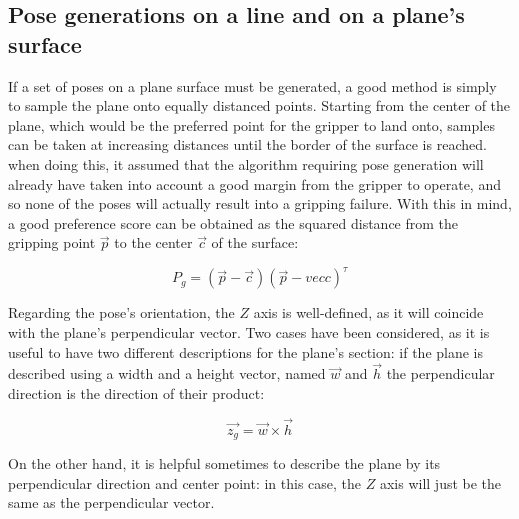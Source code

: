 \subsection{Pose generations on a line and on a plane's surface}
If a set of poses on a plane surface must be generated, a good method is simply
to sample the plane onto equally distanced points. Starting from the center of
the plane, which would be the preferred point for the gripper to land onto,
samples can be taken at increasing distances until the border of the surface is
reached. when doing this, it assumed that the algorithm requiring pose
generation will already have taken into account a good margin from the gripper
to operate, and so none of the poses will actually result into a gripping
failure. With this in mind, a good preference score can be obtained as the
squared distance from the gripping point $\vec{p}$ to the center $\vec{c}$ of the surface:

\begin{equation}
P_{g}=(\vec{p}-\vec{c})(\vec{p}-vec{c})^\tau
\end{equation}

Regarding the pose's orientation, the $Z$ axis is well-defined, as it will
coincide with the plane's perpendicular vector. Two cases have been considered,
as it is useful to have two different descriptions for the plane's section: if
the plane is described using a width and a height vector, named $\vec{w}$ and $\vec{h}$ the perpendicular
direction is the direction of their product:

\begin{equation}
  \vec{z_{g}}=\vec{w} \times \vec{h}
\end{equation}

On the other hand, it is helpful sometimes to describe the plane by its
perpendicular direction and center point: in this case, the $Z$ axis will just
be the same as the perpendicular vector.



